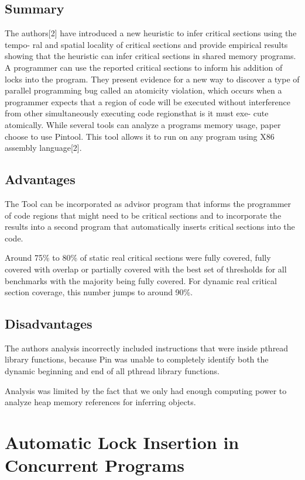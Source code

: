 \subsection{Summary}

The authors[2] have introduced a new heuristic to infer critical sections using the tempo- ral and spatial locality of critical sections and provide empirical results showing that the heuristic can infer critical sections in shared memory programs. A programmer can use the reported critical sections to inform his addition of locks into the program. They present evidence for a new way to discover a type of parallel programming bug called an atomicity violation, which occurs when a programmer expects that a region of code will be executed without interference from other simultaneously executing code regionsthat is it must exe- cute atomically. While several tools can analyze a programs memory usage, paper choose to use Pintool. This tool allows it to run on any program using X86 assembly language[2].

\subsection{Advantages}

The Tool can be incorporated as advisor program that informs the programmer of code regions that might need to be critical sections and to incorporate the results into a second program that automatically inserts critical sections into the code.

Around 75\% to 80\% of static real critical sections were fully covered, fully covered with overlap or partially covered with the best set of thresholds for all benchmarks with the majority being fully covered. For dynamic real critical section coverage, this number jumps to around 90\%.

\subsection{Disadvantages}

The authors analysis incorrectly included instructions that were inside pthread library functions, because Pin was unable to completely identify both the dynamic beginning and end of all pthread library functions.

Analysis was limited by the fact that we only had enough computing power to analyze heap memory references for inferring objects.


\section{Automatic Lock Insertion in Concurrent Programs}

